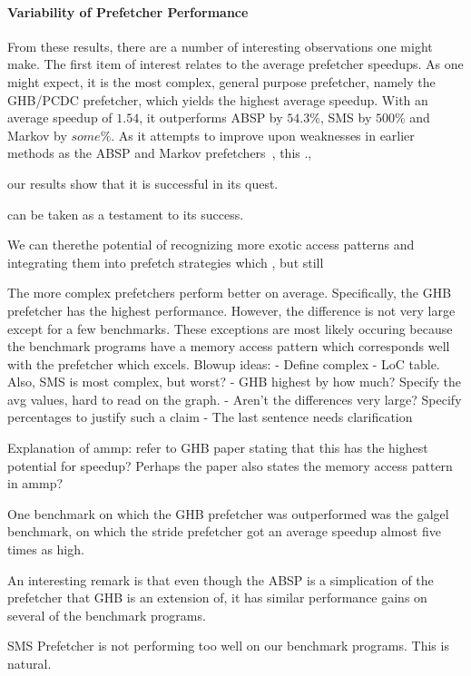 
\paragraph{Variability of Prefetcher Performance}
\label{par:varprefperf}



From these results, there are a number of interesting observations one
might make. The first item of interest relates to the average
prefetcher speedups. As one might expect, it is the most complex,
general purpose prefetcher, namely the GHB/PCDC prefetcher, which
yields the highest average speedup. With an average speedup of $1.54$,
it outperforms ABSP by $54.3\%$, SMS by $500\%$ and Markov by
$some\%$. As it attempts to improve upon weaknesses in earlier methods
as the ABSP and Markov prefetchers~\cite{Nesbit}, this .,

our results show that it is successful in
its quest. 

  can be taken as a testament to its success.


 We can therethe potential of recognizing more exotic
access patterns and integrating them into prefetch strategies which ,
but still


The more complex prefetchers perform better on average. Specifically,
the GHB prefetcher has the highest performance. However, the
difference is not very large except for a few benchmarks. These
exceptions are most likely occuring because the benchmark programs
have a memory access pattern which corresponds well with the
prefetcher which excels.
Blowup ideas:
       - Define complex - LoC table. Also, SMS is most complex, but worst?
       - GHB highest by how much? Specify the avg values, hard to read on the graph.
       - Aren't the differences very large? Specify percentages to justify such a claim
       - The last sentence needs clarification


 Explanation of ammp: refer to GHB paper stating that this has the
 highest potential for speedup? Perhaps the paper also states the
 memory access pattern in ammp?

One benchmark on which the GHB prefetcher was outperformed was the
galgel benchmark, on which the stride prefetcher got an average
speedup almost five times as high.

An interesting remark is that even though the ABSP is a simplication
of the prefetcher that GHB is an extension of, it has similar
performance gains on several of the benchmark programs.

SMS Prefetcher is not performing too well on our benchmark
programs. This is natural.



